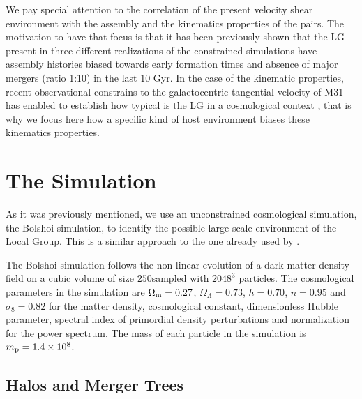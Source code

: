 \documentclass[a4,useAMS,usenatbib,usegraphicx]{latex/mn2e}
\begin{document}
We pay special attention to the correlation of the present velocity shear 
environment with the assembly and the kinematics properties of the pairs. 
The motivation to have that focus is that it has been previously shown 
that the LG present in three different realizations of the constrained 
simulations have assembly histories biased towards early formation times 
and absence of major mergers (ratio 1:10) in the last $10$ Gyr. In the 
case of the kinematic properties, recent observational constrains to the 
galactocentric tangential velocity of M31 has enabled to establish how 
typical is the LG in a cosmological context , that is why we focus here how a specific kind 
of host environment biases these kinematics properties.



\section{The Simulation}
\label{sec:the_simulation}


As it was previously mentioned, we use an unconstrained cosmological 
simulation, the Bolshoi simulation, to identify the possible large scale 
environment of the Local Group. This is a similar approach to the one already 
used by .



The Bolshoi simulation follows the non-linear evolution of a dark matter 
density field on a cubic volume of size $250$\hMpc sampled with $2048^3$ 
particles. The cosmological parameters in the simulation are 
$\Omega_{\rm m}=0.27$, $\Omega_{\Lambda}=0.73$, $h=0.70$, $n=0.95$ and 
$\sigma_{8}=0.82$ for the matter density, cosmological constant, 
dimensionless Hubble parameter, spectral index of primordial density 
perturbations and normalization for the power spectrum. The mass of each 
particle in the simulation is $m_{\rm p}=1.4\times 10^{8}$\hMsun.



\subsection{Halos and Merger Trees}
\label{subsec:halos_merger_trees}
\end{document}
